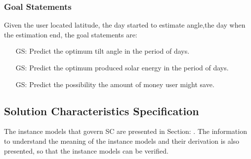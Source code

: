 \documentclass[12pt]{article}
\newcounter{goalnum} %
\begin{document}
\subsubsection{Goal Statements} \label{sec_GS}

\noindent Given the user located latitude, the day started to estimate angle,the day when the  estimation end, the goal statements are:

\begin{itemize}

\item[GS\refstepcounter{goalnum}\thegoalnum \label{G_meaningfulLabel}:] Predict the optimum tilt angle in the period of days.

\item[GS\refstepcounter{goalnum}\thegoalnum \label{G_meaningfulLabel}:] Predict the optimum produced solar energy in the period of days.

\item[GS\refstepcounter{goalnum}\thegoalnum \label{G_meaningfulLabel}:] Predict the possibility the amount of money user might save.

\end{itemize}

\subsection{Solution Characteristics Specification} \label{sec_SCS}

The instance models that govern SC are presented in Section: . The
information to understand the meaning of the instance models and their derivation is also
presented, so that the instance models can be verified.


\iffalse{}
\end{document}
